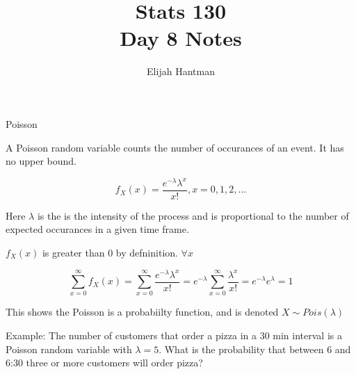 \documentclass{report}
\title{\Huge{Stats 130}\\Day 8 Notes}
\author{\huge{Elijah Hantman}}
\date{}
\begin{document}
\maketitle
\newpage

\begin{description}
    \item {\Large Poisson}
        \begin{mdframed}
            A Poisson random variable counts
            the number of occurances of an event.
            It has no upper bound.

            \begin{displaymath}
                f_X(x) = \frac{e^{-\lambda} \lambda^{x}}{x!} , x = 0, 1, 2, ...
            \end{displaymath}

            Here $\lambda$ is the is the intensity of the process
            and is proportional to the number of expected occurances
            in a given time frame.

            $f_X(x)$ is greater than 0 by defninition. $\forall x$

             \begin{displaymath}
                \sum_{x=0}^{\infty}f_X(x) =
                \sum_{x=0}^{\infty} \frac{e^{-\lambda} \lambda^{x}}{x!} =
                e^{-\lambda} \sum_{x=0}^{\infty} \frac{\lambda^{x}}{x!} =
                e^{-\lambda}e^{\lambda} = 1
            \end{displaymath}
            
            This shows the Poisson is a probabiilty function, and
            is denoted $X \sim Pois(\lambda)$
            
        \end{mdframed}
        \begin{mdframed}
            Example: The number of customers that order a pizza
            in a 30 min interval is a Poisson random variable
            with $\lambda = 5$. What is the probability that
            between 6 and 6:30 three or more customers will
            order pizza?


\end{mdframed}
\end{description}
\end{document}

